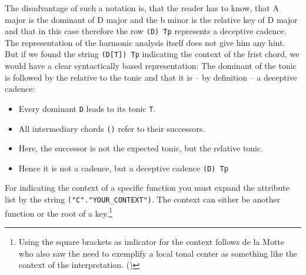\documentclass[
  DIV=calc,
  BCOR=5mm,
  12pt,
  headings=small,
  oneside,
  abstract=true,
  toc=bib,
  xcolor=dvipsnames,
  openany,
  ngerman,english]{scrartcl}
\begin{document}
\begin{center}
\end{center}

The disadvantage of such a notation is, that the reader has to know, that A
major is the dominant of D major and the b minor is the relative key of D major
and that in this case therefore the row \texttt{(D) Tp} represents a deceptive
cadence. The representation of the harmonic analysis itself does not give him
any hint. But if we found the string \texttt{(D[T]) Tp} indicating the context
of the frist chord, we would have a clear syntactically based representation:
The dominant of the tonic is followed by the relative to the tonic and that it
is -- by definition -- a deceptive cadence:

\begin{center}
\end{center}

\begin{itemize}
  \item Every dominant \texttt{D} leads to its tonic \texttt{T}.
  \item All intermediary chords \texttt{()} refer to their successors.
  \item Here, the successor is not the expected tonic, but the relative tonic.
  \item Hence it is not a cadence, but a deceptive cadence \texttt{(D) Tp}
\end{itemize}

For indicating the context of a specific function you must expand the attribute
list by the string \texttt{("C"."YOUR\_CONTEXT")}. The context can either be
another function or the root of a key.\footnote{Using the square brackets as
indicator for the context follows de la Motte who also saw the need to exemplify
a local tonal center as something like the context of the interpretation.
(\cite[cf.][144 et passim]{Delamotte2011a})}
\end{document}
